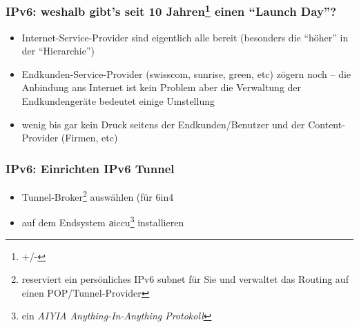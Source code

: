 \documentclass[ignorenonframetext]{beamer}
\begin{document}
\begin{frame}
\frametitle{IPv6: weshalb gibt's seit 10 Jahren\footnote{+/-} einen ``Launch Day''?}
\begin{itemize}
	\item Internet-Service-Provider sind eigentlich alle bereit (besonders die ``h\"oher'' in der ``Hierarchie'')
	\item Endkunden-Service-Provider (swisscom, sunrise, green, etc) z\"ogern noch -- die Anbindung ans Internet ist kein Problem aber die Verwaltung der Endkundenger\"ate bedeutet einige Umstellung
	\item wenig bis gar kein Druck seitens der Endkunden/Benutzer und der Content-Provider (Firmen, etc)
\end{itemize}
\end{frame}





\begin{frame}
\frametitle{IPv6: Einrichten IPv6 Tunnel}
\begin{itemize}
  \item Tunnel-Broker\footnote{reserviert ein pers\"onliches IPv6 subnet f\"ur Sie und verwaltet das Routing auf einen POP/Tunnel-Provider} ausw\"ahlen (f\"ur 6in4
  \item auf dem Endsystem {\texttt aiccu}\footnote{ein \em{AIYIA} Anything-In-Anything Protokoll} installieren
\end{itemize}
\end{frame}
\end{document}
